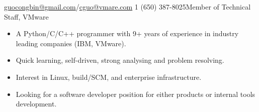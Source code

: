 \documentclass[10pt,letterpaper]{article}
\begin{document}
 



\noindent\href{mailto:guocongbin@gmail.com}{guocongbin@gmail.com}/\href{mailto:cguo@vmware.com}{cguo@vmare.com}\bull
\textsmaller{+}1 (650) 387-8025\bull Member of Technical Staff, VMware

\spacedhrule{0.9em}{-0.4em} %




\begin{itemize}
    \item A Python/C/C++ programmer with 9+ years of experience in industry leading
companies (IBM, VMware).
\item Quick learning, self-driven, strong analysing and problem resolving.
\item Interest in Linux, build/SCM, and enterprise infrastructure.
\item Looking for a software developer position for either products or internal tools
development.
\end{itemize}

\spacedhrule{0.5em}{-0.4em} %

\end{document}
